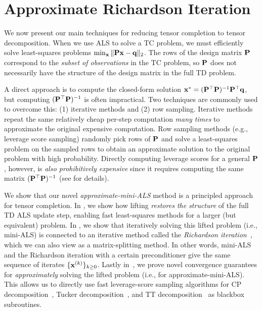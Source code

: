 \section{Approximate Richardson Iteration}
\label{sec:lifted_regression}

We now present our main techniques for reducing tensor completion to tensor decomposition.
When we use ALS to solve a TC problem,
we must efficiently solve least-squares problems $\min_{\mathbf{x}} \, \lVert\mathbf{Px}-\mathbf{q}\rVert_2$.
The rows of the design matrix $\mathbf{P}$ correspond to the \emph{subset of observations} in the TC problem,
so $\mathbf{P}$ does not necessarily have the structure of the design matrix in the full TD problem.

A direct approach is to compute the closed-form solution $\mathbf{x}^* = (\mathbf{P}^\top \mathbf{P})^{-1}\mathbf{P}^\top \mathbf{q}$, but computing $(\mathbf{P}^\top \mathbf{P})^{-1}$ is often impractical.
Two techniques are commonly used to overcome this:
(1) iterative methods and (2) row sampling.
Iterative methods repeat the same relatively cheap per-step computation
\emph{many times} to approximate the original expensive computation.
Row sampling methods (e.g., leverage score sampling) randomly pick rows of $\mathbf{P}$
and solve a least-squares problem on the sampled rows to obtain an approximate solution to the original problem with high probability.
Directly computing leverage scores for a general $\mathbf{P}$, however,
is \emph{also prohibitively expensive} since it requires computing
the same matrix $(\mathbf{P}^\top \mathbf{P})^{-1}$ (see  for details).

We show that our novel \emph{approximate-mini-ALS} method
is a principled approach for tensor completion.
In , we show how lifting \emph{restores the structure} of the full TD ALS update step,
enabling fast least-squares methods for a larger (but equivalent) problem.
In , we show that iteratively solving this lifted problem (i.e., mini-ALS) is connected to an iterative method called the \emph{Richardson iteration}~\citep{richardson1911approximate},
which we can also view as a matrix-splitting method.
In other words, mini-ALS and the Richardson iteration with a certain preconditioner give the same sequence of iterates $\{\mathbf{x}^{(k)}\}_{k \ge 0}$.
Lastly in~,
we prove novel convergence guarantees for \emph{approximately} solving the lifted problem
(i.e., for approximate-mini-ALS).
This allows us to directly use fast leverage-score sampling algorithms for
CP decomposition~\citep{cheng2016spals,larsen2022practical,bharadwaj2023fast},
Tucker decomposition~\citep{diao2019optimal,fahrbach2022subquadratic},
and TT decomposition~\citep{bharadwaj2024efficient}
as blackbox subroutines.

